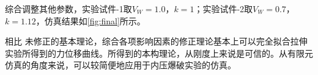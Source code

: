 \begin{figure}[!htp]
\centering
{}
\label{fig:k-MOD}
\end{figure}

综合调整其他参数，实验试件-1取$ V_W=1.0$，$ k=1 $；实验试件-2取$ V_W=0.7 $，$ k=1.12 $，仿真结果如\ref{fig:final}所示。

相比 未修正的\ha 基本理论，综合各项影响因素的修正理论基本上可以完全拟合拉伸实验所得到的力位移曲线。所得到的本构理论，从刚度上来说是可信的。从有限元仿真的角度来说，可以较简便地应用于内压爆破实验的仿真。 

